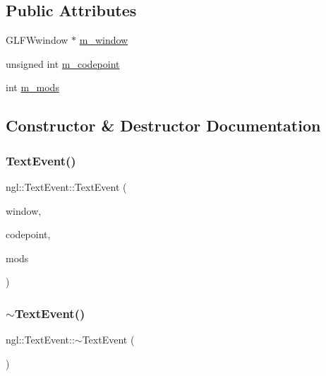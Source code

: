 \subsection*{Public Attributes}
\begin{DoxyCompactItemize}
\item 
G\+L\+F\+Wwindow $\ast$ \mbox{\hyperlink{structngl_1_1_text_event_abf9bf7882a1ba397efd151ac9fb48b19}{m\+\_\+window}}
\item 
unsigned int \mbox{\hyperlink{structngl_1_1_text_event_ae0ab75cb5b9a1f9447a6c80db630e8ed}{m\+\_\+codepoint}}
\item 
int \mbox{\hyperlink{structngl_1_1_text_event_adcc2cc88471503584293c4062ba58202}{m\+\_\+mods}}
\end{DoxyCompactItemize}


\subsection{Constructor \& Destructor Documentation}
\mbox{\label{structngl_1_1_text_event_a6609168f68c58c4337f77d5d898cfd09}} 
\subsubsection{\texorpdfstring{Text\+Event()}{TextEvent()}}
{\footnotesize\ttfamily ngl\+::\+Text\+Event\+::\+Text\+Event (\begin{DoxyParamCaption}\item[{G\+L\+F\+Wwindow $\ast$}]{window,  }\item[{const unsigned int}]{codepoint,  }\item[{const int}]{mods }\end{DoxyParamCaption})}

\mbox{\label{structngl_1_1_text_event_a3d6b1f9f96206294fc4081b53d493303}} 
\subsubsection{\texorpdfstring{$\sim$\+Text\+Event()}{~TextEvent()}}
{\footnotesize\ttfamily ngl\+::\+Text\+Event\+::$\sim$\+Text\+Event (\begin{DoxyParamCaption}{ }\end{DoxyParamCaption})}



